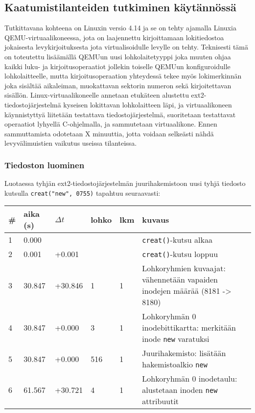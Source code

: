 \subsection{Kaatumistilanteiden tutkiminen käytännössä}

Tutkittavana kohteena on Linuxin versio 4.14 ja se on tehty ajamalla Linuxia QEMU-virtuaalikoneessa,
jota on laajennettu kirjoittamaan lokitiedostoa jokaisesta levykirjoituksesta jota virtualisoidulle levylle on tehty.
Teknisesti tämä on toteutettu lisäämällä QEMUun uusi lohkolaitetyyppi joka muuten ohjaa kaikki luku- ja kirjoitusoperaatiot jollekin toiselle QEMUun konfiguroidulle lohkolaitteelle,
mutta kirjoitusoperaation yhteydessä tekee myös lokimerkinnän joka sisältää aikaleiman, muokattavan sektorin numeron sekä kirjoitettavan sisällön.
Linux-virtuaalikoneelle annetaan etukäteen alustettu ext2-tiedostojärjestelmä kyseisen lokittavan lohkolaitteen läpi,
ja virtuaalikoneen käynnistyttyä liitetään testattava tiedostojärjestelmä,
suoritetaan testattavat operaatiot lyhyellä C-ohjelmalla,
ja sammutetaan virtuaalikone.
Ennen sammuttamista odotetaan X minuuttia,
jotta voidaan selkeästi nähdä levyvälimuistien vaikutus useissa tilanteissa.

\subsubsection{Tiedoston luominen}
\label{ChapExt2FileCreation}
Luotaessa tyhjän ext2-tiedostojärjestelmän juurihakemistoon uusi tyhjä tiedosto kutsulla \texttt{creat("new", 0755)} tapahtuu seuraavasti:

\begin{table}[H]
\begin{tabular}{l | l | l | l | l | p{7cm}}
    \# & aika (s) & $\Delta t$ & lohko & lkm & kuvaus \\ \hline \hline
    1  & 0.000    &          &      &      & \texttt{creat()}-kutsu alkaa   \\ \hline %
    2  & 0.001    & +0.001   &      &      & \texttt{creat()}-kutsu loppuu  \\ \hline %
    3  & 30.847   & +30.846  & 1    & 1    & Lohkoryhmien kuvaajat: vähennetään vapaiden inodejen määrää (8181 -> 8180)         \\ \hline %
    4  & 30.847   & +0.000   & 3    & 1    & Lohkoryhmän 0 inodebittikartta: merkitään inode \texttt{new} varatuksi \\ \hline %
    5  & 30.847   & +0.000   & 516  & 1    & Juurihakemisto: lisätään hakemistoalkio \texttt{new}                 \\ \hline %
    6  & 61.567   & +30.721  & 4    & 1    & Lohkoryhmän 0 inodetaulu: alustetaan inoden \texttt{new} attribuutit \\        %
\end{tabular}
\end{table}

